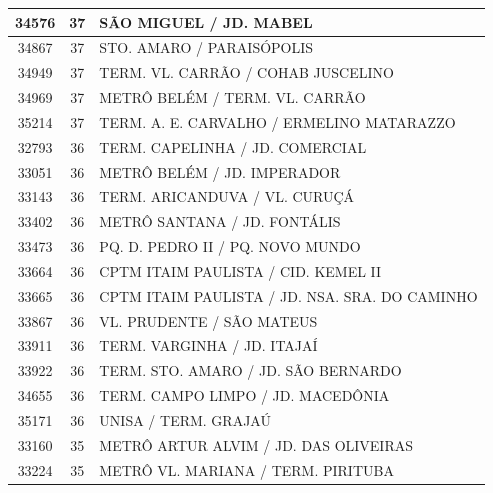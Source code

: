 \documentclass[
	12pt,				%
	oneside,			%
	a4paper,			%
	english,			%
	brazil				%
	]{abntex2ppgsi}
\begin{document}
{{\begin{apendicesenv}
\begin{longtable}{c|c|p{7cm}}
    34576 & 37    & SÃO MIGUEL / JD. MABEL \\
\hline

    34867 & 37    & STO. AMARO / PARAISÓPOLIS \\
\hline

    34949 & 37    & TERM. VL. CARRÃO / COHAB JUSCELINO \\
\hline

    34969 & 37    & METRÔ BELÉM / TERM. VL. CARRÃO \\
\hline

    35214 & 37    & TERM. A. E. CARVALHO / ERMELINO MATARAZZO \\
\hline

    32793 & 36    & TERM. CAPELINHA / JD. COMERCIAL \\
\hline

    33051 & 36    & METRÔ BELÉM / JD. IMPERADOR \\
\hline

    33143 & 36    & TERM. ARICANDUVA / VL. CURUÇÁ \\
\hline

    33402 & 36    & METRÔ SANTANA / JD. FONTÁLIS \\
\hline

    33473 & 36    & PQ. D. PEDRO II / PQ. NOVO MUNDO \\
\hline

    33664 & 36    & CPTM ITAIM PAULISTA / CID. KEMEL II \\
\hline

    33665 & 36    & CPTM ITAIM PAULISTA / JD. NSA. SRA. DO CAMINHO \\
\hline

    33867 & 36    & VL. PRUDENTE / SÃO MATEUS \\
\hline

    33911 & 36    & TERM. VARGINHA / JD. ITAJAÍ \\
\hline

    33922 & 36    & TERM. STO. AMARO / JD. SÃO BERNARDO \\
\hline

    34655 & 36    & TERM. CAMPO LIMPO / JD. MACEDÔNIA \\
\hline

    35171 & 36    & UNISA / TERM. GRAJAÚ \\
\hline

    33160 & 35    & METRÔ ARTUR ALVIM / JD. DAS OLIVEIRAS \\
\hline

    33224 & 35    & METRÔ VL. MARIANA / TERM. PIRITUBA \\
\hline


\end{longtable}
\end{apendicesenv}}}
\end{document}

